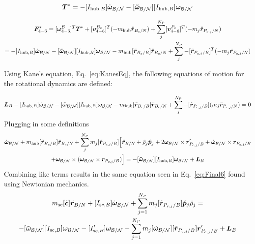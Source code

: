 \begin{equation}
	\bm T^* = -[I_{\text{hub},B}] \dot{\bm\omega}_{\cal B/N}  -[\bm{\tilde{\omega}}_{\cal B/N}] [I_{\text{hub},B}] \bm\omega_{\cal B/N}
\end{equation}

\begin{multline}
	\bm F^*_{4-6} = [\bm \omega_{4-6}^{\cal{B}}]^T \bm T^* + [\bm v^{B_c}_{4-6}]^T (-m_{\text{hub}} \ddot{\bm r}_{B_c/N}) + \sum\limits_{j}^{N_P}[\bm v^{P_c}_{4-6}]^T (-m_j \ddot{\bm r}_{P_{c,j}/N}) \\
	= -[I_{\text{hub},B}] \dot{\bm\omega}_{\cal B/N}  -[\bm{\tilde{\omega}}_{\cal B/N}] [I_{\text{hub},B}] \bm\omega_{\cal B/N} - m_{\text{hub}} [\tilde{{\bm r}}_{B_c/B}] \ddot{\bm r}_{B_c/N}  + \sum\limits_{j}^{N_P}- [\tilde{{\bm r}}_{P_{c,j}/B}]^T (-m_j \ddot{\bm r}_{P_{c,j}/N})
\end{multline}

Using Kane's equation, Eq.~\eqref{eq:KanesEq}, the following equations of motion for the rotational dynamics are defined:

\begin{equation}
	\bm L_B  -[I_{\text{hub},B}] \dot{\bm\omega}_{\cal B/N}  -[\bm{\tilde{\omega}}_{\cal B/N}] [I_{\text{hub},B}] \bm\omega_{\cal B/N} -  m_{\text{hub}} [\tilde{{\bm r}}_{B_c/B}] \ddot{\bm r}_{B_c/N}  + \sum\limits_{j}^{N_P}- [\tilde{{\bm r}}_{P_{c,j}/B}] (m_j \ddot{\bm r}_{P_{c,j}/N}) = 0
\end{equation}
Plugging in some definitions
\begin{multline}
	[I_{\text{hub},B}] \dot{\bm\omega}_{\cal B/N}  + m_{\text{hub}} [\tilde{{\bm r}}_{B_c/B}] \ddot{\bm r}_{B_c/N}  + \sum\limits_{j}^{N_P} m_j [\tilde{{\bm r}}_{P_{c,j}/B}] \Big[\ddot{\bm r}_{B/N} + \ddot{\rho}_j \hat{\bm p}_j  +2 \bm\omega_{\cal B/N} \times \bm{r}'_{P_{c,j}/B} + \dot{\bm\omega}_{\cal B/N} \times \bm{r}_{P_{c,j}/B}  \\
	+\bm\omega_{\cal B/N} \times (\bm\omega_{\cal B/N} \times \bm{r}_{P_{c,j}/B})\Big] = -[\bm{\tilde{\omega}}_{\cal B/N}] [I_{\text{hub},B}] \bm\omega_{\cal B/N} + \bm L_B
\end{multline}
Combining like terms results in the same equation seen in Eq.~\eqref{eq:Final6} found using Newtonian mechanics.
\begin{multline}
	m_{\text{sc}}[\tilde{\bm{c}}]\ddot{\bm r}_{B/N}+[I_{\text{sc},B}] \dot{\bm\omega}_{\cal B/N} + \sum\limits_{j=1}^{N_P}m_j [\tilde{\bm r}_{P_{c,j}/B}] \hat{\bm p}_j \ddot{\rho}_j = \\
	-[\bm{\tilde{\omega}}_{\cal B/N}] [I_{\text{sc},B}] \bm\omega_{\cal B/N} 
	- [I'_{\text{sc},B}] \bm\omega_{\cal B/N} 	- \sum\limits_{j=1}^{N_P} m_j [\tilde{\bm\omega}_{\cal B/N}] [\tilde{\bm{r}}_{P_{c,j}/B}] \bm{r}'_{P_{c,j}/B} + \bm{L}_B
	\label{eq:Final7}
\end{multline} 

